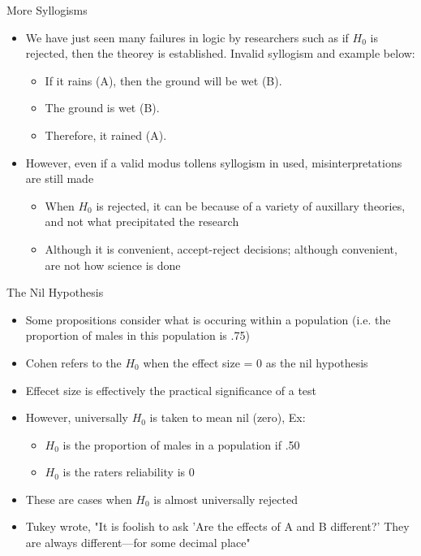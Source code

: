 \documentclass[aspectratio=169, 12pt]{beamer}
\begin{document}
\begin{frame}{More Syllogisms}
  \begin{itemize}
  \item We have just seen many failures in logic by researchers such as if $H_0$ is rejected, then the theorey is established. Invalid syllogism and example below: 
    \begin{itemize}
    \item If it rains (A), then the ground will be wet (B).
    \item The ground is wet (B).
    \item Therefore, it rained (A).
    \end{itemize}
  \item However, even if a valid modus tollens syllogism in used, misinterpretations are still made
    \begin{itemize}
   \item When $H_0$ is rejected, it can be because of a variety of auxillary theories, and not what precipitated the research
   \item Although it is convenient, accept-reject decisions; although convenient, are not how science is done
    \end{itemize}
  \end{itemize}
\end{frame}

\begin{frame}{The Nil Hypothesis}
  \begin{itemize}
  \item Some propositions consider what is occuring within a population (i.e. the proportion of males in this population is .75)
  \item Cohen refers to the $H_0$ when the effect size = 0 as the nil hypothesis
  \item Effecet size is effectively the practical significance of a test
  \item However, universally $H_0$ is taken to mean nil (zero), Ex:
    \begin{itemize}
    \item $H_0$ is the proportion of males in a population if .50
    \item $H_0$ is the raters reliability is 0
    \end{itemize}
  \item These are cases when $H_0$ is almost universally rejected
  \item Tukey wrote, "It is foolish to ask 'Are the effects of A and B different?' They are always different—for some decimal place"
  \end{itemize}
\end{frame}
\end{document}
